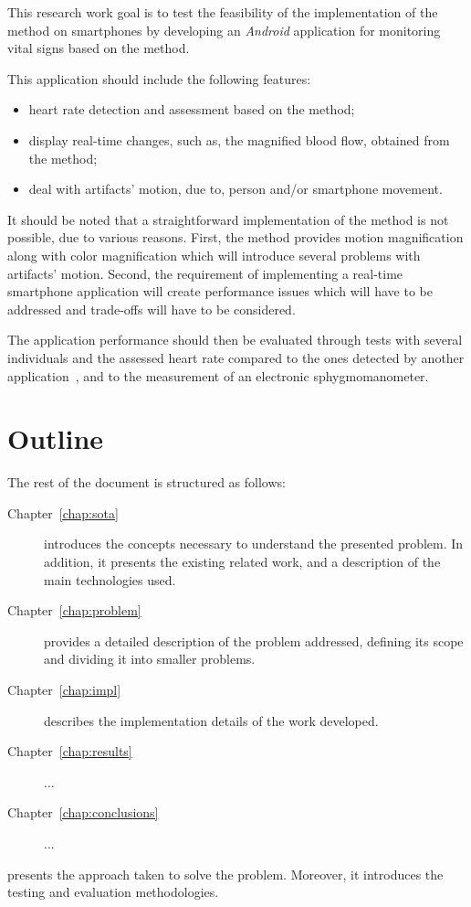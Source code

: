 
This research work goal is to test the feasibility of the
implementation of the \evm{} method on smartphones by developing
an \emph{Android} application for monitoring vital signs based on
the \evm{} method.

This application should include the following features:

\begin{itemize}
  \item heart rate detection and assessment based on the \evm{}
        method;
  \item display real-time changes, such as, the magnified blood
        flow, obtained from the \evm{} method;
  \item deal with artifacts' motion, due to, person and/or
        smartphone movement.
\end{itemize}

It should be noted that a straightforward implementation of the \evm{}
method is not possible, due to various reasons. First, the \evm{} method
provides motion magnification along with color magnification which will
introduce several problems with artifacts' motion. Second, the requirement
of implementing a real-time smartphone application will create performance
issues which will have to be addressed and trade-offs will have to be
considered.

The application performance should then be evaluated through tests
with several individuals and the assessed heart rate compared to
the ones detected by another application~\cite{Vitrox2013, Philips2013},
and to the measurement of an electronic sphygmomanometer.

\pagebreak

\section{Outline} \label{sec:intro:outline}


The rest of the document is structured as follows:

\begin{description}
  \item[Chapter~\ref{chap:sota}] introduces the concepts necessary to
        understand the presented problem. In addition, it presents
        the existing related work, and a description of the main
        technologies used.
  \item[Chapter~\ref{chap:problem}] provides a detailed description of the
        problem addressed, defining its scope and dividing it into
        smaller problems.
  \item[Chapter~\ref{chap:impl}] describes the implementation details of the
        work developed.
  \item[Chapter~\ref{chap:results}] ...
  \item[Chapter~\ref{chap:conclusions}] ...
\end{description}

presents the approach taken to
        solve the problem. Moreover, it introduces the testing and
        evaluation methodologies.
